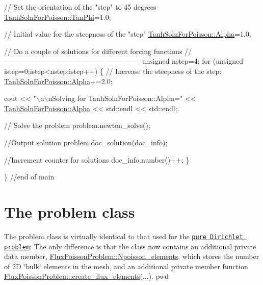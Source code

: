 \begin{DoxyCodeInclude}
 
 \textcolor{comment}{// Set the orientation of the "step" to 45 degrees}
 \hyperlink{namespaceTanhSolnForPoisson_a785ccd00a727125a5138fbbcac173294}{TanhSolnForPoisson::TanPhi}=1.0;
 
 \textcolor{comment}{// Initial value for the steepness of the "step"}
 \hyperlink{namespaceTanhSolnForPoisson_ae676ccd186d5df119cce811596d949c1}{TanhSolnForPoisson::Alpha}=1.0; 

 \textcolor{comment}{// Do a couple of solutions for different forcing functions}
 \textcolor{comment}{//---------------------------------------------------------}
 \textcolor{keywordtype}{unsigned} nstep=4;
 \textcolor{keywordflow}{for} (\textcolor{keywordtype}{unsigned} istep=0;istep<nstep;istep++)
  \{
   \textcolor{comment}{// Increase the steepness of the step:}
   \hyperlink{namespaceTanhSolnForPoisson_ae676ccd186d5df119cce811596d949c1}{TanhSolnForPoisson::Alpha}+=2.0;

   cout << \textcolor{stringliteral}{"\(\backslash\)n\(\backslash\)nSolving for TanhSolnForPoisson::Alpha="}
        << \hyperlink{namespaceTanhSolnForPoisson_ae676ccd186d5df119cce811596d949c1}{TanhSolnForPoisson::Alpha} << std::endl << std::endl;

   \textcolor{comment}{// Solve the problem}
   problem.newton\_solve();

   \textcolor{comment}{//Output solution}
   problem.doc\_solution(doc\_info);
 
   \textcolor{comment}{//Increment counter for solutions }
   doc\_info.number()++; 
  \}

\} \textcolor{comment}{//end of main}

\end{DoxyCodeInclude}




 

\hypertarget{index_problem}{}\section{The problem class}\label{index_problem}
The problem class is virtually identical to that used for the \href{../../../poisson/two_d_poisson/html/index.html}{\tt pure Dirichlet problem}\+: The only difference is that the class now contains an additional private data member, {\ttfamily \hyperlink{classFluxPoissonProblem_a1ee0cfcbc307252430a3a5ba7ab7fd6e}{Flux\+Poisson\+Problem\+::\+Npoisson\+\_\+elements}}, which stores the number of 2D \char`\"{}bulk\char`\"{} elements in the mesh, and an additional private member function {\ttfamily \hyperlink{classFluxPoissonProblem_a542ce9cc1c4e17eae68d51d2e13ac0c3}{Flux\+Poisson\+Problem\+::create\+\_\+flux\+\_\+elements}}(...). pwd

